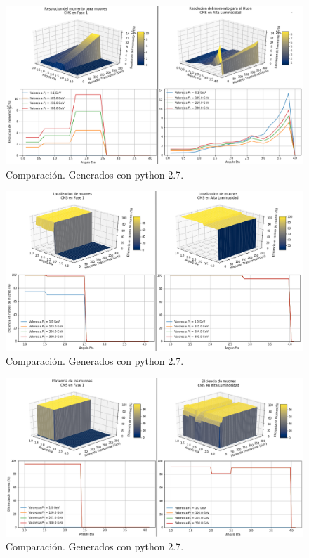 

\begin{figure}[h!]
\centering
\includegraphics[width=1\textwidth]{Analisis_y_Resultados/imagenes/Momentum_resolution_of_Muon.png}
\caption{Comparación. Generados con python 2.7.}
\end{figure}

\begin{figure}[h!]
\centering
\includegraphics[width=1\textwidth]{Analisis_y_Resultados/imagenes/Tracking_of_Muon.png}
\caption{Comparación. Generados con python 2.7.}
\end{figure}

\begin{figure}[h!]
\centering
\includegraphics[width=1\textwidth]{Analisis_y_Resultados/imagenes/Eficiencia_of_Muon.png}
\caption{Comparación. Generados con python 2.7.}
\end{figure}





